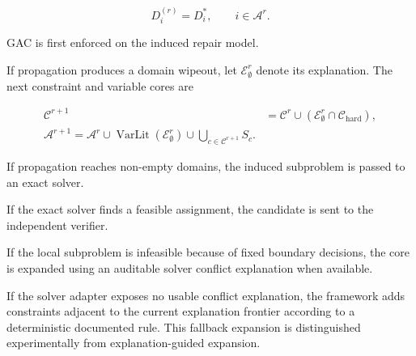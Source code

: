 \documentclass[pdflatex,sn-mathphys-num,iicol,oneside]{sn-jnl}
\begin{document}
\begin{equation}
D_i^{(r)}
=
D_i^{*},
\qquad
i\in\mathcal{A}^{r}.
\label{eq:core-domain}
\end{equation}

GAC is first enforced on the induced repair model.

If propagation produces a domain wipeout, let
$\mathcal{E}_{\emptyset}^{r}$ denote its explanation. The next
constraint and variable cores are

\begin{align}
\mathcal{C}^{r+1}
&=
\mathcal{C}^{r}
\cup
\left(
\mathcal{E}_{\emptyset}^{r}
\cap
\mathcal{C}_{\mathrm{hard}}
\right),
\label{eq:constraint-expansion}\\
\mathcal A^{r+1} = \mathcal A^r \cup \operatorname{VarLit}(\mathcal E_\emptyset^r) \cup \bigcup_{c\in\mathcal C^{r+1}}S_c.
\label{eq:variable-expansion}
\end{align}

If propagation reaches non-empty domains, the induced subproblem is
passed to an exact solver.

If the exact solver finds a feasible assignment, the candidate is
sent to the independent verifier.

If the local subproblem is infeasible because of fixed boundary
decisions, the core is expanded using an auditable solver conflict
explanation when available.

If the solver adapter exposes no usable conflict explanation, the
framework adds constraints adjacent to the current explanation
frontier according to a deterministic documented rule. This fallback
expansion is distinguished experimentally from explanation-guided
expansion.
\end{document}

